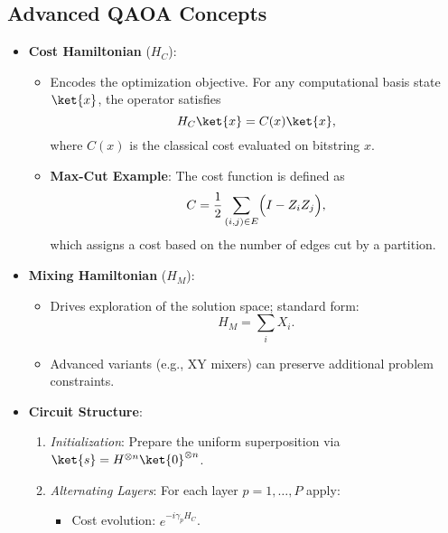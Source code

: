 \begin{multicols}{3}
                  \section*{Advanced QAOA Concepts}
                  \begin{itemize}[leftmargin=*,nosep,topsep=0pt]
                    \item \textbf{Cost Hamiltonian} ($H_C$):
                      \begin{itemize}[nosep]
                        \item Encodes the optimization objective. For any computational basis state \(\ket{x}\), the operator satisfies
                          \[
                          H_C \ket{x} = C(x) \ket{x},
                          \]
                          where \(C(x)\) is the classical cost evaluated on bitstring \(x\).
                        \item \textbf{Max-Cut Example}: The cost function is defined as
                          \[
                          C = \frac{1}{2} \sum_{(i,j) \in E} \Bigl(I - Z_i Z_j\Bigr),
                          \]
                          which assigns a cost based on the number of edges cut by a partition.
                      \end{itemize}
                    \item \textbf{Mixing Hamiltonian} ($H_M$):
                      \begin{itemize}[nosep]
                        \item Drives exploration of the solution space; standard form:
                          \[
                            H_M = \sum_i X_i.
                          \]
                        \item Advanced variants (e.g., XY mixers) can preserve additional problem constraints.
                      \end{itemize}
                    \item \textbf{Circuit Structure}:
                      \begin{enumerate}[nosep]
                        \item \textit{Initialization}: Prepare the uniform superposition via \(\ket{s}=H^{\otimes n}\ket{0}^{\otimes n}\).
                        \item \textit{Alternating Layers}: For each layer \(p=1,\dots,P\) apply:
                          \begin{itemize}[nosep]
                            \item Cost evolution: \(e^{-i\gamma_p H_C}\).

\end{itemize}
\end{enumerate}
\end{itemize}
\end{multicols}
